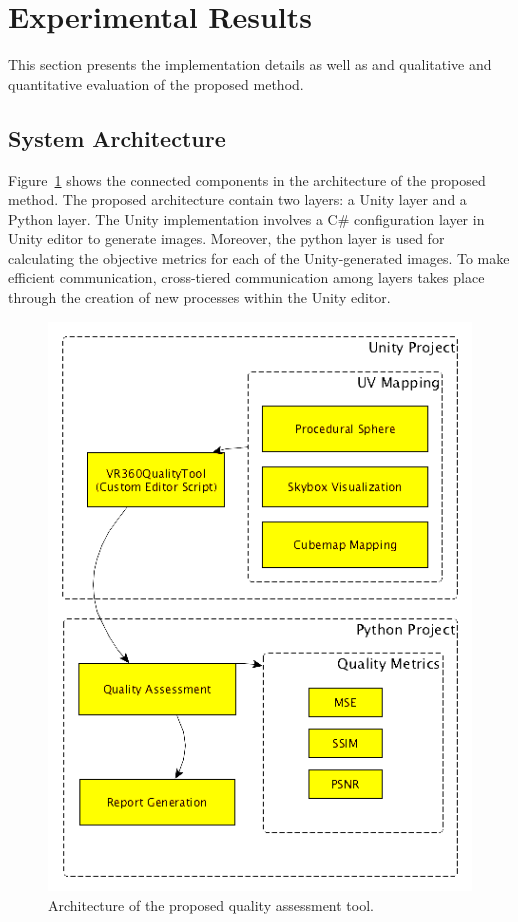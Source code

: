\documentclass[10pt,conference,pdftex]{IEEEtran}
\begin{document}
\section{Experimental Results} \label{sec:experiments}
This section presents the implementation details as well as and qualitative and quantitative evaluation of the proposed method.

\subsection{System Architecture}

Figure~\ref{fig:fig_architecture} shows the connected components in the architecture of the proposed method. The proposed architecture contain two layers: a Unity layer and a Python layer. The Unity implementation involves a C$\#$ configuration layer in Unity editor to generate images. Moreover, the python layer is used for calculating the objective metrics for each of the Unity-generated images. To make efficient communication, cross-tiered communication among layers takes place through the creation of new processes within the Unity editor.

\begin{figure}[ht!]
    \centering
        \includegraphics[width=0.9\linewidth]{tool_arch_en_edit.png}%
    \caption{Architecture of the proposed quality assessment tool.}
    \label{fig:fig_architecture}
\end{figure}
\end{document}

